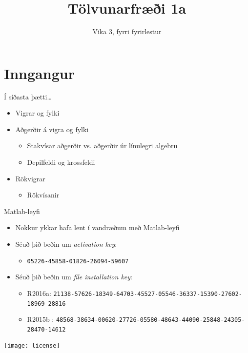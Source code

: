 \documentclass[handout]{beamer}
\title{Tölvunarfræði 1a}
\subtitle{Vika 3, fyrri fyrirlestur}
\begin{document}
\begin{frame}
\titlepage
\end{frame}

\section{Inngangur}

\begin{frame}{Í síðasta þætti\ldots}
\begin{itemize}
 \item Vigrar og fylki
 \item Aðgerðir á vigra og fylki
 \begin{itemize}
  \item Stakvísar aðgerðir vs. aðgerðir úr línulegri algebru
  \item Depilfeldi og krossfeldi
 \end{itemize}
 \item Rökvigrar
 \begin{itemize}
  \item Rökvísanir
 \end{itemize}
\end{itemize}
\end{frame}

\begin{frame}{Matlab-leyfi}
\begin{itemize}
 \item Nokkur ykkar hafa lent í vandræðum með Matlab-leyfi
 \item Séuð þið beðin um \emph{activation key}:
 \begin{itemize}
  \item \texttt{05226-45858-01826-26094-59607}
 \end{itemize}
 \item Séuð þið beðin um \emph{file installation key}:
 \begin{itemize}
  \item R2016a: {\scriptsize \texttt{21138-57626-18349-64703-45527-05546-36337-15390-27602-18969-28816 } }
  \item R2015b : {\scriptsize \texttt{48568-38634-00620-27726-05580-48643-44090-25848-24305-28470-14612 } }
 \end{itemize}
\end{itemize}
\texttt{[image: license]}
\end{frame}
\end{document}
